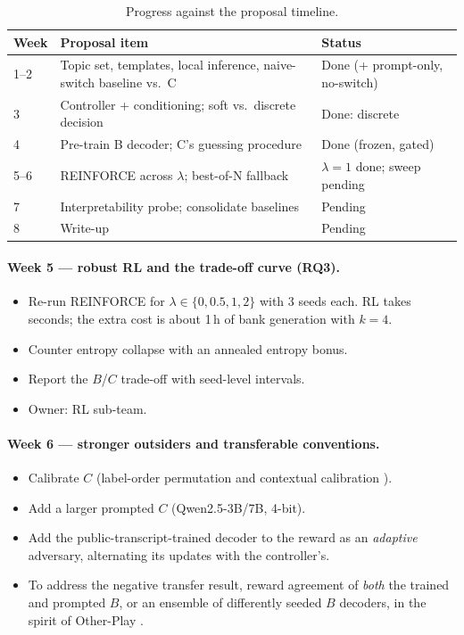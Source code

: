 \documentclass[10pt,a4paper,twocolumn]{article}
\newcommand{\1}{\mathbb{1}}
\begin{document}
\begin{table}[t]
\centering\footnotesize
\setlength{\tabcolsep}{2.5pt}
\begin{tabular}{p{0.9cm}p{4.3cm}p{1.9cm}}
\toprule
Week & Proposal item & Status\\
\midrule
1--2 & Topic set, templates, local inference, naive-switch baseline vs.\ C & Done (+ prompt-only, no-switch)\\
3 & Controller + conditioning; soft vs.\ discrete decision & Done: discrete\\
4 & Pre-train B decoder; C's guessing procedure & Done (frozen, gated)\\
5--6 & REINFORCE across $\lambda$; best-of-N fallback & $\lambda{=}1$ done; sweep pending\\
7 & Interpretability probe; consolidate baselines & Pending\\
8 & Write-up & Pending\\
\bottomrule
\end{tabular}
\caption{Progress against the proposal timeline.}
\label{tab:status}
\end{table}

\paragraph{Week 5 --- robust RL and the trade-off curve (RQ3).}
\begin{itemize}
\item Re-run REINFORCE for $\lambda\in\{0,0.5,1,2\}$ with 3 seeds each. RL takes seconds; the extra cost is about 1\,h of bank generation with $k{=}4$.
\item Counter entropy collapse with an annealed entropy bonus.
\item Report the $B$/$C$ trade-off with seed-level intervals.
\item Owner: RL sub-team.
\end{itemize}
\paragraph{Week 6 --- stronger outsiders and transferable conventions.}
\begin{itemize}
\item Calibrate $C$ (label-order permutation and contextual calibration \citep{zhao2021calibrate}).
\item Add a larger prompted $C$ (Qwen2.5-3B/7B, 4-bit).
\item Add the public-transcript-trained decoder to the reward as an \emph{adaptive} adversary, alternating its updates with the controller's.
\item To address the negative transfer result, reward agreement of \emph{both} the trained and prompted $B$, or an ensemble of differently seeded $B$ decoders, in the spirit of Other-Play \citep{hu2020otherplay}.
\end{itemize}
\end{document}

